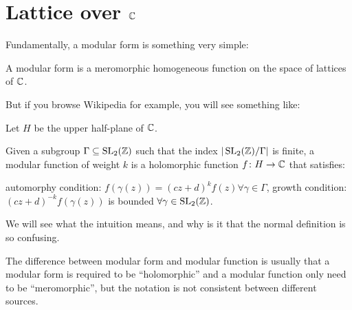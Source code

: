 \chapter{Lattice over $\mathbb C$}


Fundamentally, a modular form is something very simple:

\begin{moral}
	A modular form is a meromorphic homogeneous function on the space of lattices of $\mathbb C$.
\end{moral}


But if you browse Wikipedia for example, you will see something like:
\begin{definition}
	Let $H$ be the upper half-plane of $\mathbb C$.

	Given a subgroup $\Gamma \subseteq \operatorname{SL}_2(\mathbb Z)$ such that the index $|\operatorname{SL}_2(\mathbb Z)/\Gamma|$
	is finite, a modular function of weight $k$ is a holomorphic function $f\colon H \to \mathbb C$
	that satisfies:
	\begin{itemize}
		\ii automorphy condition: $f(\gamma(z)) = (cz+d)^k f(z) \forall \gamma \in \Gamma$,
		\ii growth condition: $(cz+d)^{-k} f(\gamma(z))$ is bounded $\forall \gamma \in \operatorname{SL}_2(\mathbb Z)$.
	\end{itemize}
\end{definition}

We will see what the intuition means, and why is it that the normal definition is so confusing.

\begin{remark}
The difference between modular form and modular function is usually that
a modular form is required to be ``holomorphic''
and a modular function only need to be ``meromorphic'',
but the notation is not consistent between different sources.
\end{remark}

